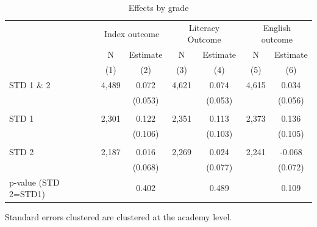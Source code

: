 \begin{table}[htbp]
  \centering
  \caption{Effects by grade}
  
  \begin{threeparttable}
  
    \begin{tabular}{lrccccc}
    \toprule
    \toprule
          & \multicolumn{2}{c}{Index outcome} & \multicolumn{2}{c}{Literacy Outcome} & \multicolumn{2}{c}{English outcome} \\
          & \multicolumn{1}{c}{N} & Estimate & N     & Estimate & N     & Estimate \\
          & \multicolumn{1}{c}{(1)} & (2)   & (3)   & (4)   & (5)   & (6) \\
    \midrule
    STD 1 \& 2 & \multicolumn{1}{c}{4,489} & 0.072 & 4,621 & 0.074 & 4,615 & 0.034 \\
          &       & (0.053) &       & (0.053) &       & (0.056) \\
          &       &       &       &       &       &  \\
    STD 1 & \multicolumn{1}{c}{2,301} & 0.122 & 2,351 & 0.113 & 2,373 & 0.136 \\
          &       & (0.106) &       & (0.103) &       & (0.105) \\
          &       &       &       &       &       &  \\
    STD 2 & \multicolumn{1}{c}{2,187} & 0.016 & 2,269 & 0.024 & 2,241 & -0.068 \\
          &       & (0.068) &       & (0.077) &       & (0.072) \\
    \midrule
    p-value (STD 2=STD1) &       & 0.402 &       & 0.489 &       & 0.109 \\
    \bottomrule
    \bottomrule
    \end{tabular}%
    
    \begin{tablenotes}
    \item Standard errors clustered are clustered at the academy level.
    \end{tablenotes}

    \end{threeparttable}
    
  \label{tab:effectsbygrade}%
\end{table}%